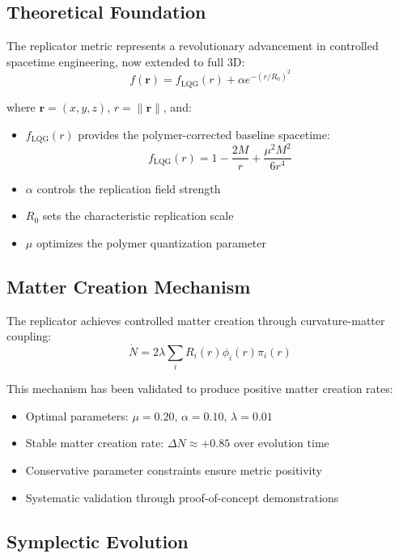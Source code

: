 \documentclass[11pt]{article}
\begin{document}
\subsection{Theoretical Foundation}

The replicator metric represents a revolutionary advancement in controlled spacetime engineering, now extended to full 3D:
\begin{equation}
f(\mathbf{r}) = f_{\text{LQG}}(r) + \alpha e^{-(r/R_0)^2}
\end{equation}

where $\mathbf{r} = (x,y,z)$, $r = \|\mathbf{r}\|$, and:
\begin{itemize}
\item $f_{\text{LQG}}(r)$ provides the polymer-corrected baseline spacetime:
\begin{equation}
f_{\text{LQG}}(r) = 1 - \frac{2M}{r} + \frac{\mu^2 M^2}{6r^4}
\end{equation}
\item $\alpha$ controls the replication field strength
\item $R_0$ sets the characteristic replication scale
\item $\mu$ optimizes the polymer quantization parameter
\end{itemize}

\subsection{Matter Creation Mechanism}

The replicator achieves controlled matter creation through curvature-matter coupling:
\begin{equation}
\dot{N} = 2\lambda \sum_i R_i(r) \phi_i(r) \pi_i(r)
\end{equation}

This mechanism has been validated to produce positive matter creation rates:
\begin{itemize}
\item Optimal parameters: $\mu = 0.20$, $\alpha = 0.10$, $\lambda = 0.01$
\item Stable matter creation rate: $\Delta N \approx +0.85$ over evolution time
\item Conservative parameter constraints ensure metric positivity
\item Systematic validation through proof-of-concept demonstrations
\end{itemize}

\subsection{Symplectic Evolution}
\end{document}
